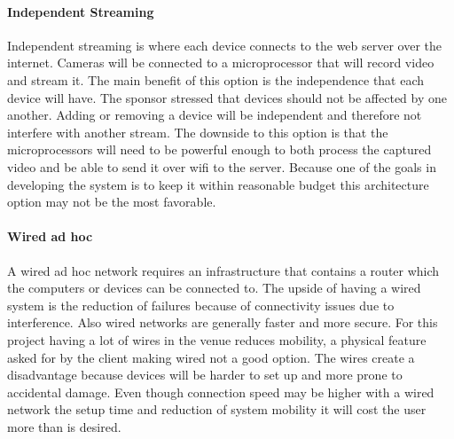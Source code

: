 \documentclass[onecolumn, draftclsnofoot,10pt, compsoc]{IEEEtran}
\begin{document}
            \paragraph{Independent Streaming } Independent streaming is where each device connects to the web server over the internet. Cameras will be connected to a microprocessor that will record video and stream it. The main benefit of this option is the independence that each device will have. The sponsor stressed that devices should not be affected by one another. Adding or removing a device will be independent and therefore not interfere with another stream. The downside to this option is that the microprocessors will need to be powerful enough to both process the captured video and be able to send it over wifi to the server. Because one of the goals in developing the system is to keep it within reasonable budget this architecture option may not be the most favorable.
            
            \paragraph{Wired ad hoc}
            A wired ad hoc network requires an infrastructure that contains a router which the computers or devices can be connected to. The upside of having a wired system is the reduction of failures because of connectivity issues due to interference. Also wired networks are generally faster and more secure. For this project having a lot of wires in the venue reduces mobility, a physical feature asked for by the client making wired not a good option. The wires create a disadvantage because devices will be harder to set up and more prone to accidental damage. Even though connection speed may be higher with a wired network the setup time and reduction of system mobility it will cost the user more than is desired.  
            
\end{document}
